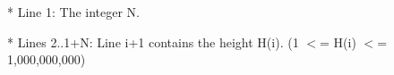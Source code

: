 * Line 1: The integer N. 

* Lines 2..1+N: Line i+1 contains the height H(i).  (1 $<$= H(i) $<$=         1,000,000,000)